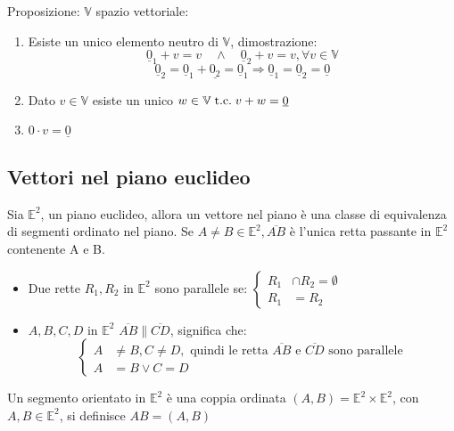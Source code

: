 \documentclass[a4paper,12pt]{article}
\begin{document}
	Proposizione: $\mathbb{V}$ spazio vettoriale:
	\begin{enumerate}
		\item Esiste un unico elemento neutro di $\mathbb{V}$, dimostrazione:
		\[\underline{0}_1 + v = v \quad \wedge \quad \underline{0}_2 + v = v, \forall v \in \mathbb{V}\]
		\[\underline{0}_2 = \underline{0}_1 + \underline{0_2} = \underline{0}_1 \Rightarrow \underline{0}_1 = \underline{0}_2 = \underline{0}\]
		\item Dato $v \in \mathbb{V}$ esiste un unico $w \in \mathbb{V} \;\text{t.c.}\; v + w = \underline{0}$
		\item $0 \cdot v = \underline{0}$ 
	\end{enumerate}
	
	\subsection{Vettori nel piano euclideo}
	Sia $\mathbb{E}^2$, un piano euclideo, allora un vettore nel piano è una classe di equivalenza di segmenti ordinato nel piano.
	Se $A \not = B \in \mathbb{E}^2, \overline{AB}$ è l'unica retta passante in $\mathbb{E}^2$ contenente A e B.
	
	\begin{center}
	\end{center}
	
	\begin{itemize}
		\item Due rette $R_1, R_2$ in $\mathbb{E}^2$ sono parallele se:
		$\left\{\begin{aligned}
			R_1 & \cap R_2 = \emptyset \\
			R_1 & = R_2
		\end{aligned}\right.$
		
		\item $A,B,C,D$ in $\mathbb{E}^2$ $\overline{AB} \parallel \overline{CD}$, significa che:
		\[
		\left\{\begin{aligned}
			A &\not = B, C \not = D, \text{ quindi le retta $\overline{AB}$ e $\overline{CD}$ sono parallele}\\
			A & = B \vee C = D
		\end{aligned}\right.
		\]
	\end{itemize}
	Un segmento orientato in $\mathbb{E}^2$ è una coppia ordinata $(A, B) = \mathbb{E}^2 \times \mathbb{E}^2$, con $A, B \in \mathbb{E}^2$, si definisce $AB = (A, B)$
	
\end{document}
